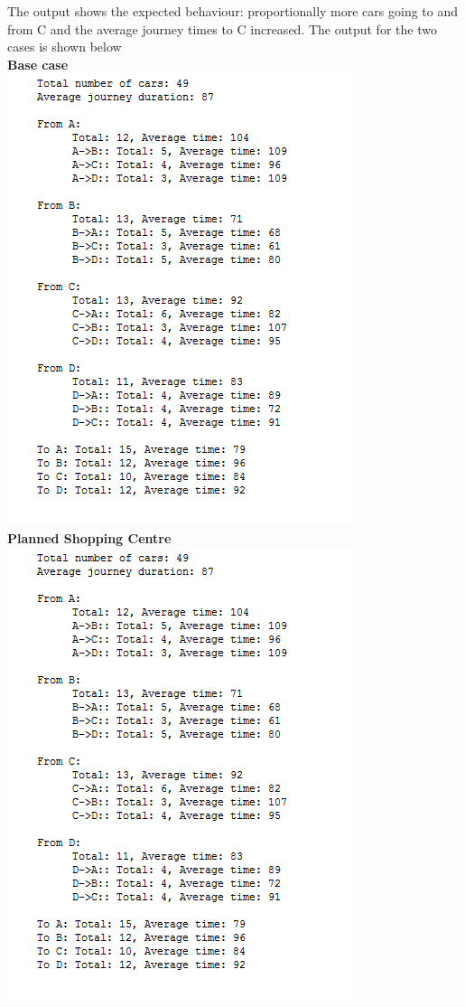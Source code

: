     The output shows the expected behaviour:  proportionally more cars going to and from C and the average journey times to C increased.  The output for the two cases is shown below\\ \textbf{Base case}\\
    \includegraphics[scale=1.0]{./images/scenario1.png}\\ \textbf{Planned Shopping Centre}\\
    \includegraphics[scale=1.0]{./images/scenario2.png}
    

